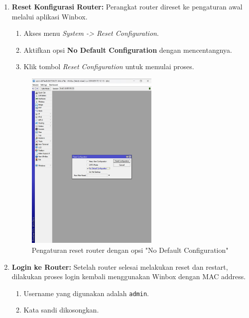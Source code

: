 \begin{enumerate}
    \item \textbf{Reset Konfigurasi Router:} Perangkat router direset ke pengaturan awal melalui aplikasi Winbox.
    \begin{enumerate}
        \item Akses menu \textit{System -> Reset Configuration}.
        \item Aktifkan opsi \textbf{No Default Configuration} dengan mencentangnya.
        \item Klik tombol \textit{Reset Configuration} untuk memulai proses.
    \end{enumerate}
    \begin{figure}[H]
        \centering
        \includegraphics[width=0.6\textwidth]{img4/ResetConfig.jpeg}
        \caption{Pengaturan reset router dengan opsi "No Default Configuration"}
    \end{figure}
    
    \item \textbf{Login ke Router:} Setelah router selesai melakukan reset dan restart, dilakukan proses login kembali menggunakan Winbox dengan MAC address.
    \begin{enumerate}
        \item Username yang digunakan adalah \texttt{admin}.
        \item Kata sandi dikosongkan.
    \end{enumerate}
\end{enumerate}

